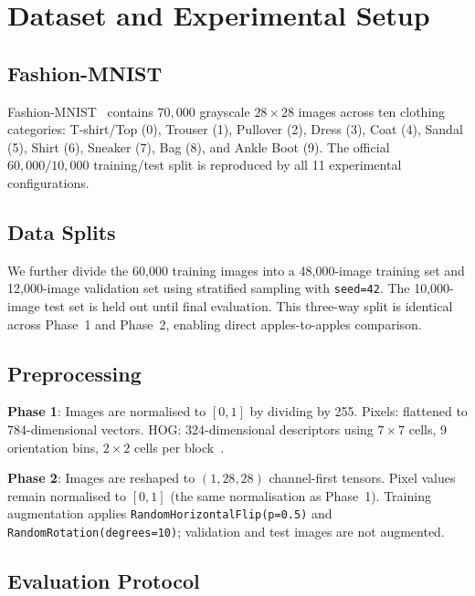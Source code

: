 \documentclass[conference]{IEEEtran}
\newcommand{\code}[1]{\texttt{#1}}
\begin{document}
\section{Dataset and Experimental Setup}\label{sec:data}

\subsection{Fashion-MNIST}

Fashion-MNIST~\cite{xiao2017fashionmnist} contains $70{,}000$ grayscale
$28\times28$ images across ten clothing categories: T-shirt/Top (0),
Trouser (1), Pullover (2), Dress (3), Coat (4), Sandal (5), Shirt (6),
Sneaker (7), Bag (8), and Ankle Boot (9). The official $60{,}000/10{,}000$
training/test split is reproduced by all 11 experimental configurations.

\subsection{Data Splits}

We further divide the 60,000 training images into a 48,000-image training
set and 12,000-image validation set using stratified sampling with
\code{seed=42}. The 10,000-image test set is held out until final
evaluation. This three-way split is identical across Phase~1 and Phase~2,
enabling direct apples-to-apples comparison.

\subsection{Preprocessing}

\textbf{Phase 1}: Images are normalised to $[0, 1]$ by dividing by 255.
Pixels: flattened to 784-dimensional vectors. HOG: 324-dimensional
descriptors using $7\times7$ cells, 9 orientation bins, $2\times2$
cells per block~\cite{dalal2005histograms}.

\textbf{Phase 2}: Images are reshaped to $(1, 28, 28)$ channel-first
tensors. Pixel values remain normalised to $[0, 1]$ (the same
normalisation as Phase~1). Training augmentation applies
\code{RandomHorizontalFlip(p=0.5)} and \code{RandomRotation(degrees=10)};
validation and test images are not augmented.

\subsection{Evaluation Protocol}
\end{document}
